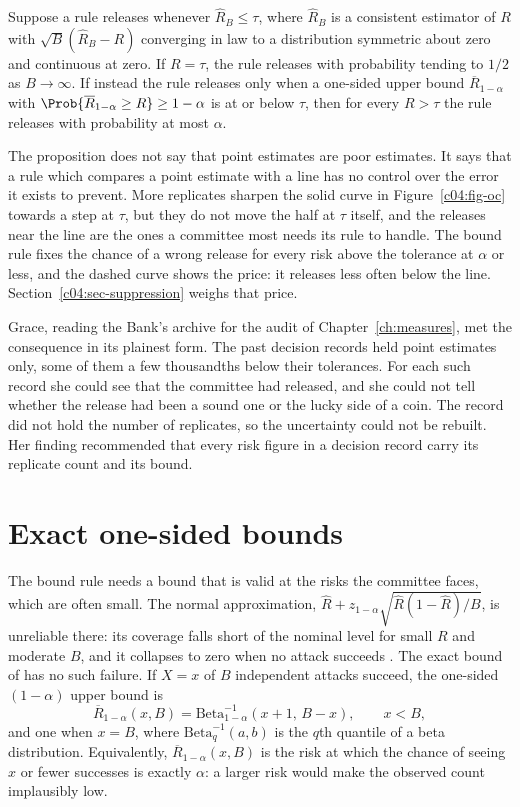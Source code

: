 \begin{proposition}\label{c04:prop-point}
Suppose a rule releases whenever $\widehat{R}_B \le \tau$, where $\widehat{R}_B$ is
a consistent estimator of $R$ with $\sqrt{B}(\widehat{R}_B - R)$ converging in law to
a distribution symmetric about zero and continuous at zero. If $R = \tau$, the rule
releases with probability tending to $1/2$ as $B \to \infty$. If instead the rule
releases only when a one-sided upper bound $\overline{R}_{1-\alpha}$ with
$\Prob\{\overline{R}_{1-\alpha} \ge R\} \ge 1-\alpha$ is at or below $\tau$, then for
every $R > \tau$ the rule releases with probability at most $\alpha$.
\end{proposition}

The proposition does not say that point estimates are poor estimates. It says that a
rule which compares a point estimate with a line has no control over the error it
exists to prevent. More replicates sharpen the solid curve in Figure~\ref{c04:fig-oc}
towards a step at $\tau$, but they do not move the half at $\tau$ itself, and the
releases near the line are the ones a committee most needs its rule to handle. The
bound rule fixes the chance of a wrong release for every risk above the tolerance at
$\alpha$ or less, and the dashed curve shows the price: it releases less often below
the line. Section~\ref{c04:sec-suppression} weighs that price.

Grace, reading the Bank's archive for the audit of Chapter~\ref{ch:measures}, met the
consequence in its plainest form. The past decision records held point estimates only,
some of them a few thousandths below their tolerances. For each such record she could
see that the committee had released, and she could not tell whether the release had been
a sound one or the lucky side of a coin. The record did not hold the number of
replicates, so the uncertainty could not be rebuilt. Her finding recommended that every
risk figure in a decision record carry its replicate count and its bound.

\section{Exact one-sided bounds}

The bound rule needs a bound that is valid at the risks the committee faces, which are often
small. The normal approximation, $\widehat{R} + z_{1-\alpha}\sqrt{\widehat{R}(1-\widehat{R})/B}$,
is unreliable there: its coverage falls short of the nominal level for small $R$ and
moderate $B$, and it collapses to zero when no attack succeeds \citep{brown2001}. The
exact bound of \citet{clopper1934} has no such failure. If $X = x$ of $B$ independent
attacks succeed, the one-sided $(1-\alpha)$ upper bound is
\begin{equation}\label{c04:eq-cp}
\overline{R}_{1-\alpha}(x,B) = \mathrm{Beta}^{-1}_{1-\alpha}(x+1,\,B-x), \qquad x < B,
\end{equation}
and one when $x = B$, where $\mathrm{Beta}^{-1}_{q}(a,b)$ is the $q$th quantile of a
beta distribution. Equivalently, $\overline{R}_{1-\alpha}(x,B)$ is the risk at which the
chance of seeing $x$ or fewer successes is exactly $\alpha$: a larger risk would make the
observed count implausibly low.

